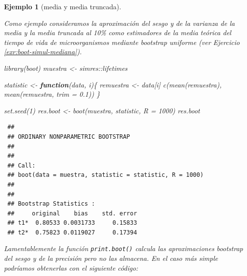 \documentclass[
  10pt,
]{book}
\newenvironment{Shaded}{\begin{snugshade}}{\end{snugshade}}
\newcommand{\AttributeTok}[1]{\textcolor[rgb]{0.77,0.63,0.00}{#1}}
\newcommand{\ControlFlowTok}[1]{\textcolor[rgb]{0.13,0.29,0.53}{\textbf{#1}}}
\newcommand{\DecValTok}[1]{\textcolor[rgb]{0.00,0.00,0.81}{#1}}
\newcommand{\FloatTok}[1]{\textcolor[rgb]{0.00,0.00,0.81}{#1}}
\newcommand{\FunctionTok}[1]{\textcolor[rgb]{0.00,0.00,0.00}{#1}}
\newcommand{\NormalTok}[1]{#1}
\newcommand{\OtherTok}[1]{\textcolor[rgb]{0.56,0.35,0.01}{#1}}
\newcommand{\SpecialCharTok}[1]{\textcolor[rgb]{0.00,0.00,0.00}{#1}}
\theoremstyle{break}
\newtheorem{example}{Ejemplo}[chapter]
\theoremstyle{nonumberplain}
\begin{document}
\begin{example}[media y media truncada]
\protect\hypertarget{exm:boot-simul-sesgo-var}{}\label{exm:boot-simul-sesgo-var}

Como ejemplo consideramos la aproximación del sesgo y de la varianza de la media y la media truncada al 10\% como estimadores de la media teórica del tiempo de vida de microorganismos mediante bootstrap uniforme (ver Ejercicio \ref{exr:boot-simul-mediana}).

\begin{Shaded}
\begin{Highlighting}[]
\FunctionTok{library}\NormalTok{(boot)}
\NormalTok{muestra }\OtherTok{\textless{}{-}}\NormalTok{ simres}\SpecialCharTok{::}\NormalTok{lifetimes}

\NormalTok{statistic }\OtherTok{\textless{}{-}} \ControlFlowTok{function}\NormalTok{(data, i)\{}
\NormalTok{  remuestra }\OtherTok{\textless{}{-}}\NormalTok{ data[i]}
  \FunctionTok{c}\NormalTok{(}\FunctionTok{mean}\NormalTok{(remuestra), }\FunctionTok{mean}\NormalTok{(remuestra, }\AttributeTok{trim =} \FloatTok{0.1}\NormalTok{))}
\NormalTok{\}}

\FunctionTok{set.seed}\NormalTok{(}\DecValTok{1}\NormalTok{)}
\NormalTok{res.boot }\OtherTok{\textless{}{-}} \FunctionTok{boot}\NormalTok{(muestra, statistic, }\AttributeTok{R =} \DecValTok{1000}\NormalTok{)}
\NormalTok{res.boot}
\end{Highlighting}
\end{Shaded}

\begin{verbatim}
 ## 
 ## ORDINARY NONPARAMETRIC BOOTSTRAP
 ## 
 ## 
 ## Call:
 ## boot(data = muestra, statistic = statistic, R = 1000)
 ## 
 ## 
 ## Bootstrap Statistics :
 ##     original    bias    std. error
 ## t1*  0.80533 0.0031733     0.15833
 ## t2*  0.75823 0.0119027     0.17394
\end{verbatim}

Lamentablemente la función \texttt{print.boot()} calcula las aproximaciones bootstrap del sesgo y de la precisión pero no las almacena.
En el caso más simple podríamos obtenerlas con el siguiente código:


\end{example}
\end{document}

